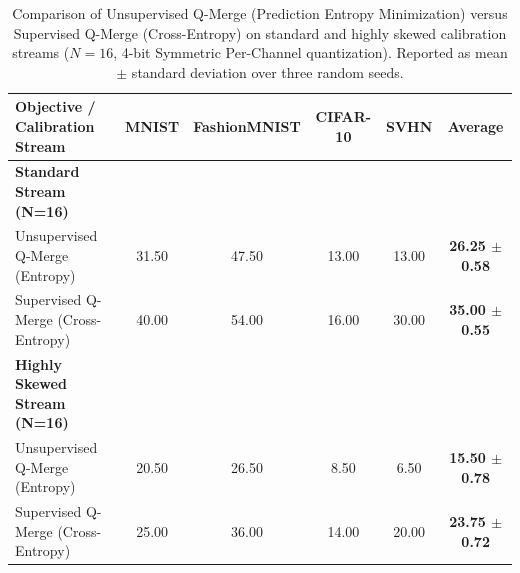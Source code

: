 \begin{table}[t]
\caption{Comparison of Unsupervised Q-Merge (Prediction Entropy Minimization) versus Supervised Q-Merge (Cross-Entropy) on standard and highly skewed calibration streams ($N=16$, 4-bit Symmetric Per-Channel quantization). Reported as mean $\pm$ standard deviation over three random seeds.}
\label{tab:supervised_comparison}
\vskip 0.15in
\begin{center}
\begin{small}
\begin{sc}
\begin{tabular}{lccccc}
\toprule
Objective / Calibration Stream & MNIST & FashionMNIST & CIFAR-10 & SVHN & \textbf{Average} \\
\midrule
\textbf{Standard Stream (N=16)} & & & & & \\
Unsupervised Q-Merge (Entropy) & 31.50 & 47.50 & 13.00 & 13.00 & \textbf{26.25 $\pm$ 0.58} \\
Supervised Q-Merge (Cross-Entropy) & 40.00 & 54.00 & 16.00 & 30.00 & \textbf{35.00 $\pm$ 0.55} \\
\midrule
\textbf{Highly Skewed Stream (N=16)} & & & & & \\
Unsupervised Q-Merge (Entropy) & 20.50 & 26.50 &  8.50 &  6.50 & \textbf{15.50 $\pm$ 0.78} \\
Supervised Q-Merge (Cross-Entropy) & 25.00 & 36.00 & 14.00 & 20.00 & \textbf{23.75 $\pm$ 0.72} \\
\bottomrule
\end{tabular}
\end{sc}
\end{small}
\end{center}
\vskip -0.1in
\end{table}

